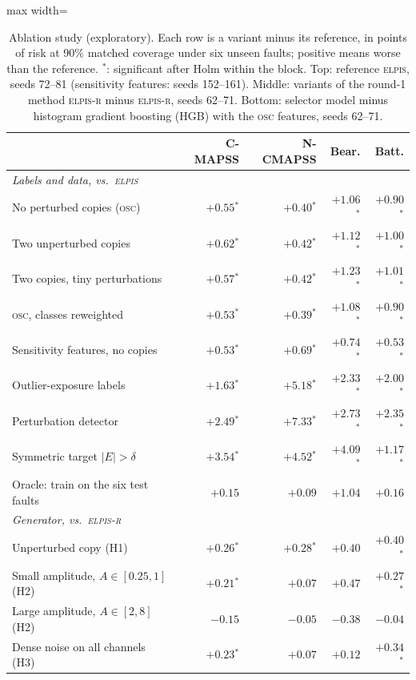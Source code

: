 \documentclass{esannV2}
\newcommand{\OSC}{\textsc{osc}}
\newcommand{\RPT}{\textsc{elpis}}
\newcommand{\Rone}{\textsc{elpis-r}}
\newcommand{\s}{$^{\ast}$}
\begin{document}
\begin{table}[!htbp]
\caption{Ablation study (exploratory). Each row is a variant minus its reference, in points of risk at 90\% matched coverage under six unseen faults; positive means worse than the reference. \s: significant after Holm within the block. Top: reference \RPT, seeds 72--81 (sensitivity features: seeds 152--161). Middle: variants of the round-1 method \Rone{} minus \Rone, seeds 62--71. Bottom: selector model minus histogram gradient boosting (HGB) with the \OSC{} features, seeds 62--71.}
\label{tab:ablation}
\centering\footnotesize
\setlength{\tabcolsep}{3.5pt}
\begin{adjustbox}{max width=\textwidth}\begin{tabular}{lrrrr}
\toprule
 & C-MAPSS & N-CMAPSS & Bear. & Batt.\\
\midrule
\multicolumn{5}{l}{\emph{Labels and data, vs.\ \RPT}}\\
No perturbed copies (\OSC) & $+0.55$\s & $+0.40$\s & $+1.06$\s & $+0.90$\s\\
Two unperturbed copies & $+0.62$\s & $+0.42$\s & $+1.12$\s & $+1.00$\s\\
Two copies, tiny perturbations & $+0.57$\s & $+0.42$\s & $+1.23$\s & $+1.01$\s\\
\OSC, classes reweighted & $+0.53$\s & $+0.39$\s & $+1.08$\s & $+0.90$\s\\
Sensitivity features, no copies & $+0.53$\s & $+0.69$\s & $+0.74$\s & $+0.53$\s\\
Outlier-exposure labels~\cite{hendrycks2019deep} & $+1.63$\s & $+5.18$\s & $+2.33$\s & $+2.00$\s\\
Perturbation detector~\cite{isermann2005model} & $+2.49$\s & $+7.33$\s & $+2.73$\s & $+2.35$\s\\
Symmetric target $|E|>\delta$ & $+3.54$\s & $+4.52$\s & $+4.09$\s & $+1.17$\s\\
Oracle: train on the six test faults & $+0.15$ & $+0.09$ & $+1.04$ & $+0.16$\\
\midrule
\multicolumn{5}{l}{\emph{Generator, vs.\ \Rone}}\\
Unperturbed copy (H1) & $+0.26$\s & $+0.28$\s & $+0.40$ & $+0.40$\s\\
Small amplitude, $A\in[0.25,1]$ (H2) & $+0.21$\s & $+0.07$ & $+0.47$ & $+0.27$\s\\
Large amplitude, $A\in[2,8]$ (H2) & $-0.15$ & $-0.05$ & $-0.38$ & $-0.04$\\
Dense noise on all channels (H3) & $+0.23$\s & $+0.07$ & $+0.12$ & $+0.34$\s\\

\end{tabular}
\end{adjustbox}
\end{table}
\end{document}
